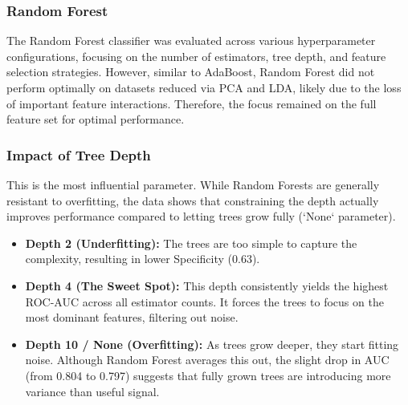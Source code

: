 \documentclass[12pt,a4paper]{article}
\begin{document}
\subsubsection{Random Forest}
The Random Forest classifier was evaluated across various hyperparameter configurations, focusing on the number of estimators, tree depth, and feature selection strategies. However, similar to AdaBoost, Random Forest did not perform optimally on datasets reduced via PCA and LDA, likely due to the loss of important feature interactions. Therefore, the focus remained on the full feature set for optimal performance.

\subsubsection*{Impact of Tree Depth}
This is the most influential parameter. While Random Forests are generally resistant to overfitting, the data shows that constraining the depth actually improves performance compared to letting trees grow fully (`None` parameter).

\begin{itemize}
    \item \textbf{Depth 2 (Underfitting):} The trees are too simple to capture the complexity, resulting in lower Specificity (0.63).
    \item \textbf{Depth 4 (The Sweet Spot):} This depth consistently yields the highest ROC-AUC across all estimator counts. It forces the trees to focus on the most dominant features, filtering out noise.
    \item \textbf{Depth 10 / None (Overfitting):} As trees grow deeper, they start fitting noise. Although Random Forest averages this out, the slight drop in AUC (from 0.804 to 0.797) suggests that fully grown trees are introducing more variance than useful signal.
\end{itemize}
\end{document}
